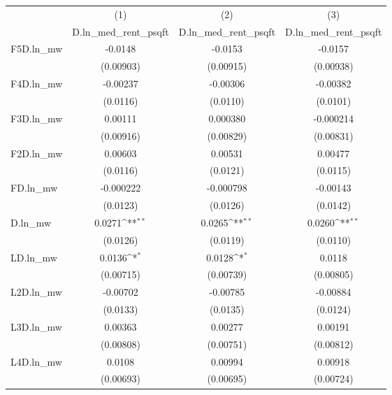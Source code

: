 {
\def\sym#1{\ifmmode^{#1}\else\(^{#1}\)\fi}
\begin{tabular}{l*{3}{c}}
\hline\hline
          &\multicolumn{1}{c}{(1)}&\multicolumn{1}{c}{(2)}&\multicolumn{1}{c}{(3)}\\
          &\multicolumn{1}{c}{D.ln\_med\_rent\_psqft}&\multicolumn{1}{c}{D.ln\_med\_rent\_psqft}&\multicolumn{1}{c}{D.ln\_med\_rent\_psqft}\\
\hline
F5D.ln\_mw &  -0.0148         &  -0.0153         &  -0.0157         \\
          &(0.00903)         &(0.00915)         &(0.00938)         \\
[1em]
F4D.ln\_mw & -0.00237         & -0.00306         & -0.00382         \\
          & (0.0116)         & (0.0110)         & (0.0101)         \\
[1em]
F3D.ln\_mw &  0.00111         & 0.000380         &-0.000214         \\
          &(0.00916)         &(0.00829)         &(0.00831)         \\
[1em]
F2D.ln\_mw &  0.00603         &  0.00531         &  0.00477         \\
          & (0.0116)         & (0.0121)         & (0.0115)         \\
[1em]
FD.ln\_mw  &-0.000222         &-0.000798         & -0.00143         \\
          & (0.0123)         & (0.0126)         & (0.0142)         \\
[1em]
D.ln\_mw   &   0.0271\sym{**} &   0.0265\sym{**} &   0.0260\sym{**} \\
          & (0.0126)         & (0.0119)         & (0.0110)         \\
[1em]
LD.ln\_mw  &   0.0136\sym{*}  &   0.0128\sym{*}  &   0.0118         \\
          &(0.00715)         &(0.00739)         &(0.00805)         \\
[1em]
L2D.ln\_mw & -0.00702         & -0.00785         & -0.00884         \\
          & (0.0133)         & (0.0135)         & (0.0124)         \\
[1em]
L3D.ln\_mw &  0.00363         &  0.00277         &  0.00191         \\
          &(0.00808)         &(0.00751)         &(0.00812)         \\
[1em]
L4D.ln\_mw &   0.0108         &  0.00994         &  0.00918         \\
          &(0.00693)         &(0.00695)         &(0.00724)         \\

\end{tabular}}
